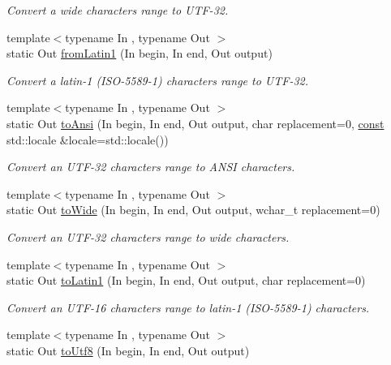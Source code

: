 \begin{DoxyCompactItemize}
\begin{DoxyCompactList}\small\item\em Convert a wide characters range to U\-T\-F-\/32. \end{DoxyCompactList}\item 
{\footnotesize template$<$typename In , typename Out $>$ }\\static Out \hyperlink{classsf_1_1_utf_3_0132_01_4_a05741b76b5a26267a72735e40ca61c55}{from\-Latin1} (In begin, In end, Out output)
\begin{DoxyCompactList}\small\item\em Convert a latin-\/1 (I\-S\-O-\/5589-\/1) characters range to U\-T\-F-\/32. \end{DoxyCompactList}\item 
{\footnotesize template$<$typename In , typename Out $>$ }\\static Out \hyperlink{classsf_1_1_utf_3_0132_01_4_a768cb205f7f1d20cd900e34fb48f9316}{to\-Ansi} (In begin, In end, Out output, char replacement=0, \hyperlink{term__entry_8h_a57bd63ce7f9a353488880e3de6692d5a}{const} std\-::locale \&locale=std\-::locale())
\begin{DoxyCompactList}\small\item\em Convert an U\-T\-F-\/32 characters range to A\-N\-S\-I characters. \end{DoxyCompactList}\item 
{\footnotesize template$<$typename In , typename Out $>$ }\\static Out \hyperlink{classsf_1_1_utf_3_0132_01_4_a0d5bf45a9732beb935592da6bed1242c}{to\-Wide} (In begin, In end, Out output, wchar\-\_\-t replacement=0)
\begin{DoxyCompactList}\small\item\em Convert an U\-T\-F-\/32 characters range to wide characters. \end{DoxyCompactList}\item 
{\footnotesize template$<$typename In , typename Out $>$ }\\static Out \hyperlink{classsf_1_1_utf_3_0132_01_4_a064ce0ad81768d0d99b6b3e2e980e3ce}{to\-Latin1} (In begin, In end, Out output, char replacement=0)
\begin{DoxyCompactList}\small\item\em Convert an U\-T\-F-\/16 characters range to latin-\/1 (I\-S\-O-\/5589-\/1) characters. \end{DoxyCompactList}\item 
{\footnotesize template$<$typename In , typename Out $>$ }\\static Out \hyperlink{classsf_1_1_utf_3_0132_01_4_a193e155964b073c8ba838434f41d5e97}{to\-Utf8} (In begin, In end, Out output)

\end{DoxyCompactItemize}
